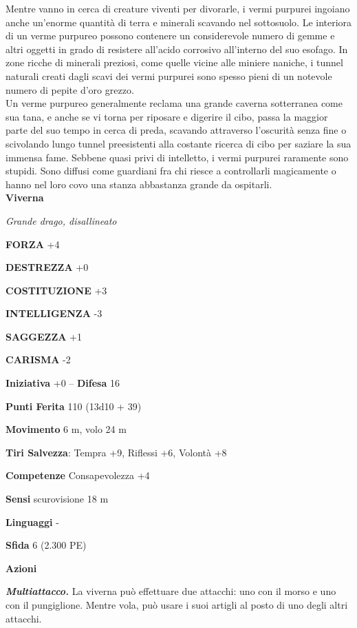 \begin{multicols}{2}
Mentre vanno in cerca di creature viventi per divorarle, i vermi purpurei ingoiano anche un'enorme quantità di terra e minerali scavando nel sottosuolo. Le interiora di un verme purpureo possono contenere un considerevole numero di gemme e altri oggetti in grado di resistere all'acido corrosivo all'interno del suo esofago. In zone ricche di minerali preziosi, come quelle vicine alle miniere naniche, i tunnel naturali creati dagli scavi dei vermi purpurei sono spesso pieni di un notevole numero di pepite d'oro grezzo.\\

Un verme purpureo generalmente reclama una grande caverna sotterranea come sua tana, e anche se vi torna per riposare e digerire il cibo, passa la maggior parte del suo tempo in cerca di preda, scavando attraverso l'oscurità senza fine o scivolando lungo tunnel preesistenti alla costante ricerca di cibo per saziare la sua immensa fame. Sebbene quasi privi di intelletto, i vermi purpurei raramente sono stupidi. Sono diffusi come guardiani fra chi riesce a controllarli magicamente o hanno nel loro covo una stanza abbastanza grande da ospitarli.\\


\medskip{}\textbf{Viverna}

\emph{Grande drago, disallineato}

\textbf{FORZA} +4

\textbf{DESTREZZA} +0

\textbf{COSTITUZIONE} +3

\textbf{INTELLIGENZA} -3

\textbf{SAGGEZZA} +1

\textbf{CARISMA} -2

\textbf{Iniziativa} +0 -- \textbf{Difesa} 16

\textbf{Punti Ferita} 110 (13d10 + 39)

\textbf{Movimento} 6 m, volo 24 m

\textbf{Tiri Salvezza}: Tempra +9, Riflessi +6, Volontà +8

\textbf{Competenze} Consapevolezza +4

\textbf{Sensi} scurovisione 18 m

\textbf{Linguaggi} -

\textbf{Sfida} 6 (2.300 PE)

\textbf{Azioni}

\emph{\textbf{Multiattacco.}} La viverna può effettuare due attacchi: uno con il morso e uno con il pungiglione. Mentre vola, può usare i suoi artigli al posto di uno degli altri attacchi.


\end{multicols}
